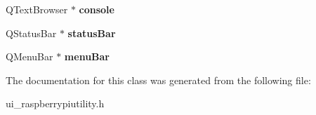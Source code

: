 \begin{DoxyCompactItemize}
\mbox{\label{classUi__RaspberryPiUtilityClass_ac3dfb631ee5092c7e5d6a1ad752b3cae}} 
Q\+Text\+Browser $\ast$ {\bfseries console}
\item 
\mbox{\label{classUi__RaspberryPiUtilityClass_a9fe0b24bca1b22ecbbbfb41b75a3ae4e}} 
Q\+Status\+Bar $\ast$ {\bfseries status\+Bar}
\item 
\mbox{\label{classUi__RaspberryPiUtilityClass_a28b44b9d6e69cc9ef45bfc1162702927}} 
Q\+Menu\+Bar $\ast$ {\bfseries menu\+Bar}
\end{DoxyCompactItemize}


The documentation for this class was generated from the following file\+:\begin{DoxyCompactItemize}
\item 
ui\+\_\+raspberrypiutility.\+h\end{DoxyCompactItemize}
